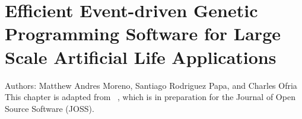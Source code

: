 \chapter{Efficient Event-driven Genetic Programming Software for Large Scale Artificial Life Applications}
\label{ch:sgp-lite}

\noindent
Authors: Matthew Andres Moreno, Santiago Rodriguez Papa, and Charles Ofria \\
This chapter is adapted from ~\citep{moreno2021signalgp}, which is in preparation for the Journal of Open Source Software (JOSS).






